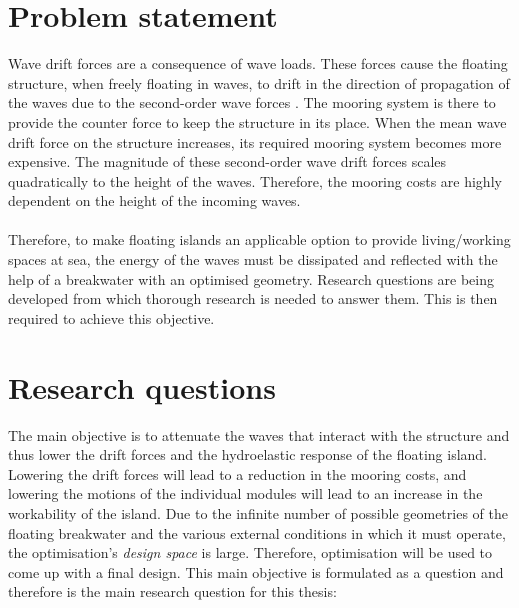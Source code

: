 \section{Problem statement}
Wave drift forces are a consequence of wave loads. These forces cause the floating structure, when freely floating in waves, to drift in the direction of propagation of the waves due to the second-order wave forces \parencite{journee2000offshore}. The mooring system is there to provide the counter force to keep the structure in its place. When the mean wave drift force on the structure increases, its required mooring system becomes more expensive. The magnitude of these second-order wave drift forces scales quadratically to the height of the waves. Therefore, the mooring costs are highly dependent on the height of the incoming waves.\\
\\



Therefore, to make floating islands an applicable option to provide living/working spaces at sea, the energy of the waves must be dissipated and reflected with the help of a breakwater with an optimised geometry. Research questions are being developed from which thorough research is needed to answer them. This is then required to achieve this objective.



\section{Research questions}
\label{sec: research questions}
The main objective is to attenuate the waves that interact with the structure and thus lower the drift forces and the hydroelastic response of the floating island. Lowering the drift forces will lead to a reduction in the mooring costs, and lowering the motions of the individual modules will lead to an increase in the workability of the island. Due to the infinite number of possible geometries of the floating breakwater and the various external conditions in which it must operate, the optimisation's \textit{design space} is large. Therefore, optimisation will be used to come up with a final design. This main objective is formulated as a question and therefore is the main research question for this thesis: 

